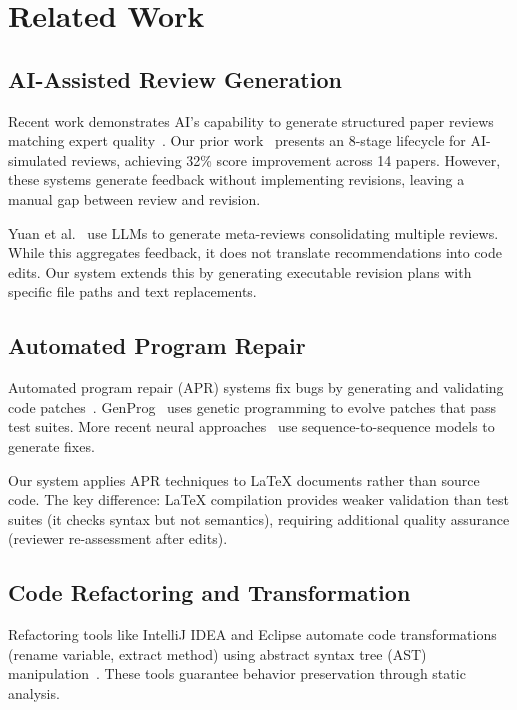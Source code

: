 \section{Related Work}
\label{sec:related}

\subsection{AI-Assisted Review Generation}

Recent work demonstrates AI's capability to generate structured paper reviews matching expert quality~\cite{damour2023simulated}. Our prior work~\cite{dellalibera2026review} presents an 8-stage lifecycle for AI-simulated reviews, achieving 32\% score improvement across 14 papers. However, these systems generate feedback without implementing revisions, leaving a manual gap between review and revision.

Yuan et al.~\cite{yuan2024llm} use LLMs to generate meta-reviews consolidating multiple reviews. While this aggregates feedback, it does not translate recommendations into code edits. Our system extends this by generating executable revision plans with specific file paths and text replacements.

\subsection{Automated Program Repair}

Automated program repair (APR) systems fix bugs by generating and validating code patches~\cite{monperrus2018automatic}. GenProg~\cite{le2012genprog} uses genetic programming to evolve patches that pass test suites. More recent neural approaches~\cite{chen2019sequencer} use sequence-to-sequence models to generate fixes.

Our system applies APR techniques to LaTeX documents rather than source code. The key difference: LaTeX compilation provides weaker validation than test suites (it checks syntax but not semantics), requiring additional quality assurance (reviewer re-assessment after edits).

\subsection{Code Refactoring and Transformation}

Refactoring tools like IntelliJ IDEA and Eclipse automate code transformations (rename variable, extract method) using abstract syntax tree (AST) manipulation~\cite{opdyke1992refactoring}. These tools guarantee behavior preservation through static analysis.

